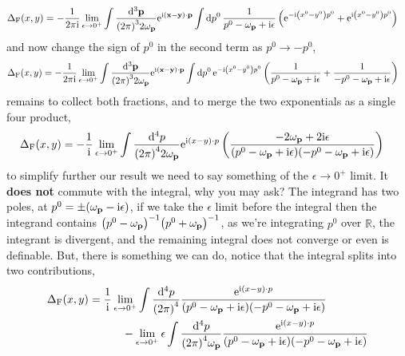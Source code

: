 \begin{align}
    \Delta_{\textnormal{F}}\qty(x,y) &=-\frac{1}{2\pi\textnormal{i}}\lim\limits_{\epsilon\rightarrow 0^+} \int\frac{\dd[3]{\vb p}}{\qty(2\pi)^32\omega_{\vb p}}\textnormal{e}^{\textnormal{i} \qty(\vb x-\vb y)\cdot \vb p}\int\dd{p^0}\frac{1}{p^0-\omega_{\vb p}+\textnormal{i}\epsilon}\left(\textnormal{e}^{-\textnormal{i} \qty(x^0-y^0)p^0}+\textnormal{e}^{\textnormal{i} \qty(x^0-y^0)p^0}\right)
\end{align}
and now change the sign of $p^0$ in the second term as $p^0\rightarrow -p^0$,
\begin{align}
    \Delta_{\textnormal{F}}\qty(x,y) &=-\frac{1}{2\pi\textnormal{i}}\lim\limits_{\epsilon\rightarrow 0^+} \int\frac{\dd[3]{\vb p}}{\qty(2\pi)^32\omega_{\vb p}}\textnormal{e}^{\textnormal{i} \qty(\vb x-\vb y)\cdot \vb p}\int\dd{p^0}\textnormal{e}^{-\textnormal{i} \qty(x^0-y^0)p^0}\left(\frac{1}{p^0-\omega_{\vb p}+\textnormal{i}\epsilon}+\frac{1}{-p^0-\omega_{\vb p}+\textnormal{i}\epsilon}\right)
\end{align}
remains to collect both fractions, and to merge the two exponentials as a single four product,
\begin{align}
    \Delta_{\textnormal{F}}\qty(x,y) &=-\frac{1}{\textnormal{i}}\lim\limits_{\epsilon\rightarrow 0^+} \int\frac{\dd[4]{ p}}{\qty(2\pi)^42\omega_{\vb p}}\textnormal{e}^{\textnormal{i} \qty(x- y)\cdot p}\left(\frac{-2\omega_{\vb p}+2\textnormal{i}\epsilon}{\qty(p^0-\omega_{\vb p}+\textnormal{i}\epsilon)\qty(-p^0-\omega_{\vb p}+\textnormal{i}\epsilon)}\right)
\end{align}
to simplify further our result we need to say something of the $\epsilon\rightarrow0^+$ limit. It \textbf{does not} commute with the integral, why you may ask? The integrand has two poles, at $p^0 = \pm\qty(\omega_{\vb p}-\textnormal{i}\epsilon)$, 
if we take the $\epsilon$ limit before the integral then the integrand contains $\qty(p^0-\omega_{\vb p})^{-1}\qty(p^0+\omega_{\vb p})^{-1}$, as we're integrating $p^0$ over $\mathbb R$, the integrant is divergent, and the 
remaining integral does not converge or even is definable. But, there is something we can do, notice that the integral splits into two contributions,
\begin{align}
    \Delta_{\textnormal{F}}\qty(x,y) &=\frac{1}{\textnormal{i}}\lim\limits_{\epsilon\rightarrow 0^+} \int\frac{\dd[4]{ p}}{\qty(2\pi)^4}\frac{\textnormal{e}^{\textnormal{i} \qty(x- y)\cdot p}}{\qty(p^0-\omega_{\vb p}+\textnormal{i}\epsilon)\qty(-p^0-\omega_{\vb p}+\textnormal{i}\epsilon)}\nonumber\\
    &\quad\quad\quad-\lim\limits_{\epsilon\rightarrow 0^+}\epsilon \int\frac{\dd[4]{ p}}{\qty(2\pi)^4\omega_{\vb p}}\frac{\textnormal{e}^{\textnormal{i} \qty(x- y)\cdot p}}{\qty(p^0-\omega_{\vb p}+\textnormal{i}\epsilon)\qty(-p^0-\omega_{\vb p}+\textnormal{i}\epsilon)}
\end{align}

